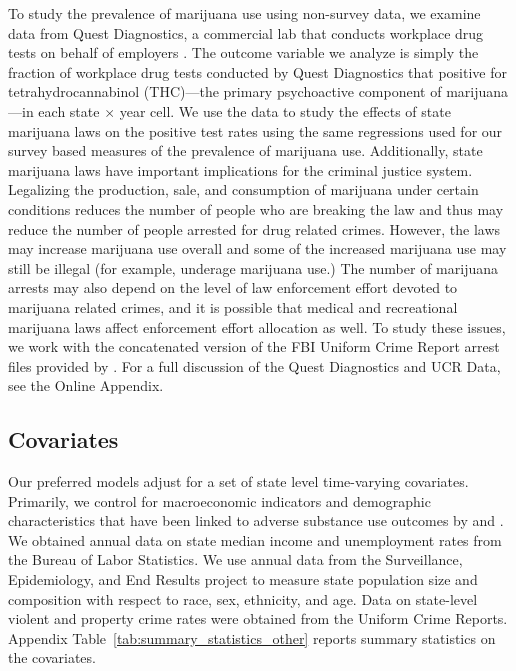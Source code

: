 \documentclass[12pt]{article}%
\begin{document}
To study the prevalence of marijuana use using non-survey data, we examine data from Quest Diagnostics, a commercial lab that conducts workplace drug tests on behalf of employers \citep{questdiagnostics}. The outcome variable we analyze is simply the fraction of workplace drug tests conducted by Quest Diagnostics that positive for tetrahydrocannabinol (THC)---the primary psychoactive component of marijuana---in each state $\times$ year cell.
We use the data to study the effects of state marijuana laws on the positive test rates using the same regressions used for our survey based measures of the prevalence of marijuana use. Additionally, state marijuana laws  have important implications for the criminal justice system. Legalizing the production, sale, and consumption of marijuana under certain conditions reduces the number of people who are breaking the law and thus may reduce the number of people arrested for drug related crimes. However, the laws may increase marijuana use overall and some of the increased marijuana use may still be illegal (for example, underage marijuana use.) The number of marijuana arrests may also depend on the level of law enforcement effort devoted to marijuana related crimes, and it is possible that medical and recreational marijuana laws affect enforcement effort allocation as well. To study these issues, we work with the concatenated version of the FBI Uniform Crime Report arrest files provided by \citet{kaplan2020}. For a full discussion of the Quest Diagnostics and UCR Data, see the Online Appendix. 

\subsection{Covariates}\label{sec:data_covariates}

Our preferred models adjust for a set of state level time-varying covariates. Primarily, we control for macroeconomic indicators and demographic characteristics that have been linked to adverse substance use outcomes by \cite{Hollingsworth2017} and \cite{Ruhm2018}. We obtained annual data on state median income and unemployment rates from the Bureau of Labor Statistics. We use annual data from the Surveillance, Epidemiology, and End Results project to measure state population size and composition with respect to race, sex, ethnicity, and age. Data on state-level violent and property crime rates were obtained from the Uniform Crime Reports. Appendix Table~\ref{tab:summary_statistics_other} reports summary statistics on the covariates.
    
\end{document}
